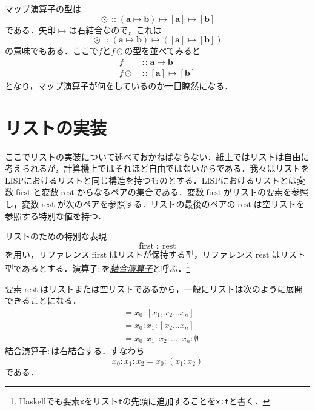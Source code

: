\documentclass[a5paper,draft]{jsbook}
\newcommand{\programminglanguage}[1]{\textsf{#1}}
\newcommand{\haskell}{\programminglanguage{Haskell}}
\newcommand{\keyword}[1]{{\underline{\emph{#1}}}}
\newcommand{\code}[1]{\texttt{#1}}
\newcommand{\mathTypeParameter}[1]{\mathbf{#1}}
\newcommand{\mathListType}[1]{\left[#1\right]}
\newcommand{\mathBinaryOperator}[1]{\operatorname{#1}}
\newcommand{\mathIn}{\mathBinaryOperator{:\!:}}
\newcommand{\mathMapsTo}{\mapsto}
\newcommand{\mathSpecialFunction}[1]{\operatorname{\mathrm{#1}}}
\newcommand{\mathFirst}{\mathSpecialFunction{first}}
\newcommand{\mathRest}{\mathSpecialFunction{rest}}
\newcommand{\mathMorph}[2]{#1\mathMapsTo#2}
\newcommand{\mathMorphII}[3]{#1\mathMapsTo#2\mathMapsTo#3}
\DeclareMathOperator{\hsklMap}{\odot}
\DeclareMathOperator{\hsklOf}{::}
\newcommand{\hsklEmptyList}{\emptyset}
\begin{document}
マップ演算子の型は
\begin{equation}
\hsklMap\hsklOf{}\mathMorphII{(\mathMorph{\mathTypeParameter{a}}{\mathTypeParameter{b}})}{\mathListType{\mathTypeParameter{a}}}{\mathListType{\mathTypeParameter{b}}}
\end{equation}
である．矢印$\mathMapsTo$は右結合なので，これは
\begin{equation}
\hsklMap\hsklOf{}\mathMorph{(\mathMorph{\mathTypeParameter{a}}{\mathTypeParameter{b}})}{(\mathMorph{\mathListType{\mathTypeParameter{a}}}{\mathListType{\mathTypeParameter{b}}})}
\end{equation}
の意味でもある．ここで$f$と$f\hsklMap$の型を並べてみると
\begin{align*}
f&\mathIn\mathMorph{\mathTypeParameter{a}}{\mathTypeParameter{b}}\\
f\hsklMap&\mathIn\mathMorph{\mathListType{\mathTypeParameter{a}}}{\mathListType{\mathTypeParameter{b}}}
\end{align*}
となり，マップ演算子が何をしているのか一目瞭然になる．

\section{リストの実装}

ここでリストの実装について述べておかねばならない．紙上ではリストは自由に考えられるが，計算機上ではそれほど自由ではないからである．我々はリストをLISPにおけるリストと同じ構造を持つものとする．LISPにおけるリストとは変数$\mathFirst$と変数$\mathRest$からなるペアの集合である．変数$\mathFirst$がリストの要素を参照し，変数$\mathRest$が次のペアを参照する．リストの最後のペアの$\mathRest$は空リストを参照する特別な値を持つ．

リストのための特別な表現
\begin{equation}
\mathFirst:\mathRest
\end{equation}
を用い，リファレンス$\mathFirst$はリストが保持する型，リファレンス$\mathRest$はリスト型であるとする．演算子$:$を\keyword{結合演算子}と呼ぶ．\footnote{\haskell でも要素\code{x}をリスト\code{t}の先頭に追加することを\code{x:t}と書く．}

要素$\mathRest$はリストまたは空リストであるから，一般にリストは次のように展開できることになる．
\begin{align*}
[x_0,x_1,x_2\dots x_n]&=x_0:[x_1,x_2\dots x_n]\\
&=x_0:x_1:[x_2\dots x_n]\\
&=x_0:x_1:x_2:\dots:x_n:\hsklEmptyList
\end{align*}
結合演算子$:$は右結合する．すなわち$$x_0:x_1:x_2=x_0:(x_1:x_2)$$である．
\end{document}

